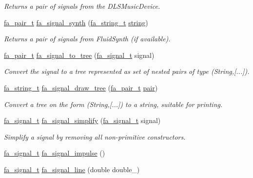 \begin{DoxyCompactItemize}
\begin{DoxyCompactList}\small\item\em Returns a pair of signals from the {\ttfamily D\-L\-S\-Music\-Device}. \end{DoxyCompactList}\item 
\hyperlink{group___fa_pair_gac2b2e58c230bac4f8a63ef6c05072680}{fa\-\_\-pair\-\_\-t} \hyperlink{group___fa_signal_ga56865171462df9c523cb69a0eddc02e0}{fa\-\_\-signal\-\_\-synth} (\hyperlink{group___fa_string_gacada63033b77bc6c39fa632ae199349b}{fa\-\_\-string\-\_\-t} \hyperlink{util_8h_a41106000aac73b61e4fc2ef9dd39a603}{string})
\begin{DoxyCompactList}\small\item\em Returns a pair of signals from Fluid\-Synth (if available). \end{DoxyCompactList}\item 
\hyperlink{group___fa_pair_gac2b2e58c230bac4f8a63ef6c05072680}{fa\-\_\-pair\-\_\-t} \hyperlink{group___fa_signal_ga5c1bdc15c82e386e0558044f3ba71dd7}{fa\-\_\-signal\-\_\-to\-\_\-tree} (\hyperlink{group___fa_signal_gac5c72f160cd6e93a6783551627b166e5}{fa\-\_\-signal\-\_\-t} signal)
\begin{DoxyCompactList}\small\item\em Convert the signal to a tree represented as set of nested pairs of type {\ttfamily (String,\mbox{[}...\mbox{]})}. \end{DoxyCompactList}\item 
\hyperlink{group___fa_string_gacada63033b77bc6c39fa632ae199349b}{fa\-\_\-string\-\_\-t} \hyperlink{group___fa_signal_gaa0b336a99a11410484bd1696afc674e9}{fa\-\_\-signal\-\_\-draw\-\_\-tree} (\hyperlink{group___fa_pair_gac2b2e58c230bac4f8a63ef6c05072680}{fa\-\_\-pair\-\_\-t} \hyperlink{util_8h_a40ed40659d2ed7f8712b0fe6ba6edebe}{pair})
\begin{DoxyCompactList}\small\item\em Convert a tree on the form {\ttfamily (String,\mbox{[}...\mbox{]})} to a string, suitable for printing. \end{DoxyCompactList}\item 
\hyperlink{group___fa_signal_gac5c72f160cd6e93a6783551627b166e5}{fa\-\_\-signal\-\_\-t} \hyperlink{group___fa_signal_ga73034bc81f821b9c0b2b2c12a17bf05c}{fa\-\_\-signal\-\_\-simplify} (\hyperlink{group___fa_signal_gac5c72f160cd6e93a6783551627b166e5}{fa\-\_\-signal\-\_\-t} signal)
\begin{DoxyCompactList}\small\item\em Simplify a signal by removing all non-\/primitive constructors. \end{DoxyCompactList}\item 
\hyperlink{group___fa_signal_gac5c72f160cd6e93a6783551627b166e5}{fa\-\_\-signal\-\_\-t} \hyperlink{group___fa_signal_gab58471c81821440157ba721c92813ce7}{fa\-\_\-signal\-\_\-impulse} ()
\item 
\hyperlink{group___fa_signal_gac5c72f160cd6e93a6783551627b166e5}{fa\-\_\-signal\-\_\-t} \hyperlink{group___fa_signal_gabe3aa8818aadaf932b3bae49bdb77a47}{fa\-\_\-signal\-\_\-line} (double double\-\_\-)
\end{DoxyCompactItemize}


